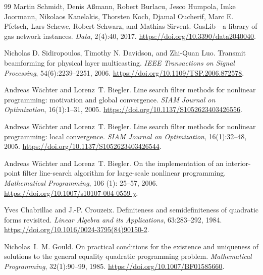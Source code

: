 \documentclass[pdflatex,sn-mathphys-num]{sn-jnl}
\theoremstyle{thmstyleone}
\theoremstyle{thmstylethree}
\newcounter{algorithm}
\begin{document}
\begin{thebibliography}{99}
Martin Schmidt, Denis A\ss mann, Robert Burlacu, Jesco Humpola, Imke Joormann,
Nikolaos Kanelakis, Thorsten Koch, Djamal Oucherif, Marc E. Pfetsch,
Lars Schewe, Robert Schwarz, and Mathias Sirvent.
\newblock GasLib---a library of gas network instances.
\newblock \emph{Data}, 2(4):40, 2017.
\newblock \url{https://doi.org/10.3390/data2040040}.

Nicholas D. Sidiropoulos, Timothy N. Davidson, and Zhi-Quan Luo.
\newblock Transmit beamforming for physical layer multicasting.
\newblock \emph{IEEE Transactions on Signal Processing}, 54(6):2239--2251, 2006.
\newblock \url{https://doi.org/10.1109/TSP.2006.872578}.

Andreas W\"achter and Lorenz~T. Biegler.
\newblock Line search filter methods for nonlinear programming:
  motivation and global convergence.
\newblock \emph{SIAM Journal on Optimization}, 16(1):1--31, 2005.
\newblock \url{https://doi.org/10.1137/S1052623403426556}.

Andreas W\"achter and Lorenz~T. Biegler.
\newblock Line search filter methods for nonlinear programming:
  local convergence.
\newblock \emph{SIAM Journal on Optimization}, 16(1):32--48, 2005.
\newblock \url{https://doi.org/10.1137/S1052623403426544}.

Andreas W{\"a}chter and Lorenz~T. Biegler.
\newblock On the implementation of an interior-point filter line-search
  algorithm for large-scale nonlinear programming.
\newblock \emph{Mathematical Programming}, 106 (1): 25--57,
  2006.
\newblock \url{https://doi.org/10.1007/s10107-004-0559-y}.

Yves Chabrillac and J.-P. Crouzeix.
\newblock Definiteness and semidefiniteness of quadratic forms revisited.
\newblock \emph{Linear Algebra and its Applications}, 63:283--292, 1984.
\newblock \url{https://doi.org/10.1016/0024-3795(84)90150-2}.

Nicholas~I.~M. Gould.
\newblock On practical conditions for the existence and uniqueness of
  solutions to the general equality quadratic programming problem.
\newblock \emph{Mathematical Programming}, 32(1):90--99, 1985.
\newblock \url{https://doi.org/10.1007/BF01585660}.


\end{thebibliography}
\end{document}
